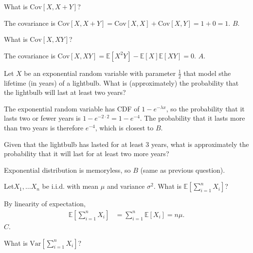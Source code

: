 \documentclass[a4paper]{article}
\begin{document}
\begin{Exercise}
	What is $\text{Cov}[X, X + Y]$?
\end{Exercise}
\begin{Solution}
	The covariance is $\text{Cov}[X, X + Y] = \text{Cov}[X, X] + \text{Cov}[X, Y] = 1 + 0 = 1.$ $\boxed{B}$.
\end{Solution}
\begin{Exercise}
	What is $\text{Cov}[X, XY]$?
\end{Exercise}
\begin{Solution}
	The covariance is $\text{Cov}[X, XY] = \mathbb{E}[X^2Y] - \mathbb{E}[X] \mathbb{E}[XY] = 0.$ $\boxed{A}$.
\end{Solution}
\begin{Exercise}
	Let $X$ be an exponential random variable with parameter $\frac{1}{2}$ that model sthe lifetime (in years) of a lightbulb. What is (approximately) the probability that the lightbulb will last at least two years?
\end{Exercise}
\begin{Solution}
	The exponential random variable has CDF of $1 - e^{-\lambda x}$, so the probability that it lasts two or fewer years is $1 - e^{-2 \cdot 2} = 1 - e^{-4}$. The probability that it lasts more than two years is therefore $e^{-4}$, which is closest to $\boxed{B}$.
\end{Solution}
\begin{Exercise}
	Given that the lightbulb has lasted for at least 3 years, what is approximately the probability that it will last for at least two more years?
\end{Exercise}
\begin{Solution}
	Exponential distribution is memoryless, so $\boxed{B}$ (same as previous question).
\end{Solution}
\begin{Exercise}
	Let$X_1, \ldots X_n$ be i.i.d. with mean $\mu$ and variance $\sigma^2$. What is $\mathbb{E}\left[\sum_{i = 1}^n X_i\right]$?
\end{Exercise}
\begin{Solution}
	By linearity of expectation,
	\begin{align*}
		\mathbb{E} \left[ \sum_{i = 1}^{n} X_i \right] &= \sum_{i = 1}^{n} \mathbb{E}[X_i] = n \mu.
	\end{align*}
	$\boxed{C}$.
\end{Solution}
\begin{Exercise}
	What is $\text{Var}[\sum_{i = 1}^{n} X_i]$?
\end{Exercise}
\end{document}
